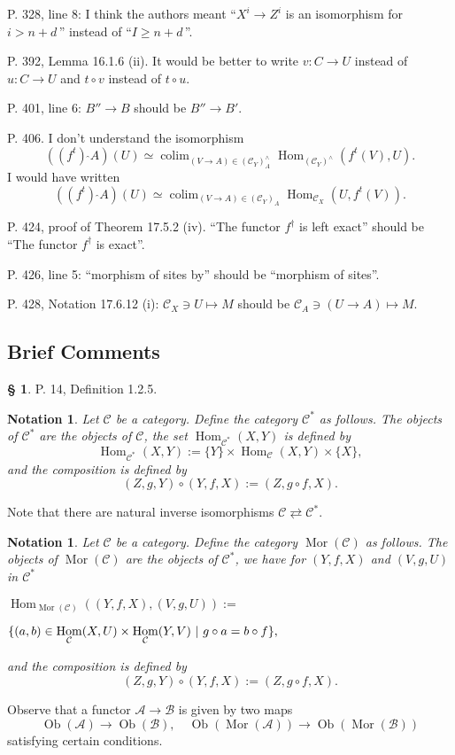 \documentclass[12pt]{article}
\newtheorem{nota}[thm]{Notation}
\theoremstyle{remark}
\theoremstyle{definition}
\newtheorem{cm}[thm]{\S}
\newcommand{\bc}{\begin{cm}}\newcommand{\ec}{\end{cm}}
\newcommand{\bu}{\bullet}
\newcommand{\n}{\noindent}
\newcommand{\A}{\mathcal A}
\newcommand{\B}{\mathcal B}
\newcommand{\C}{\mathcal C}
\newcommand{\be}{\begin{equation}}
\newcommand{\ee}{\end{equation}}
\DeclareMathOperator*{\co}{colim}
\DeclareMathOperator{\h}{Hom}
\DeclareMathOperator{\Mor}{Mor}
\DeclareMathOperator{\Ob}{Ob}
\begin{document}
\n P. 328, line 8: I think the authors meant ``$X^i\to Z^i$ is an isomorphism for $i>n+d\,$'' instead of ``$I\ge n+d\,$''. 

\n P. 392, Lemma 16.1.6 (ii). It would be better to write $v:C\to U$ instead of $u:C\to U$ and $t\circ v$ instead of $t\circ u$. 

\n P. 401, line 6: $B''\to B$ should be $B''\to B'$.

\n P. 406. I don't understand the isomorphism 
\be\label{406}
\left((f^t)\ \widehat{}A\right)(U)\simeq\co_{(V\to A)\in(\C_Y)_A^\wedge}\h_{(\C_Y)^\wedge}(f^t(V),U).
\ee 
I would have written 
$$
\left((f^t)\ \widehat{}A\right)(U)\simeq\co_{(V\to A)\in(\C_Y)_A}\h_{\C_X}(U,f^t(V)).
$$

\n P. 424, proof of Theorem 17.5.2 (iv). ``The functor $f^\dagger$ is left exact'' should be ``The functor $f^\dagger$ is exact''.

\n P. 426, line 5: ``morphism of sites by'' should be ``morphism of sites''.

\n P. 428, Notation 17.6.12 (i): $\C_X\ni U\mapsto M$ should be $\C_A\ni(U\to A)\mapsto M$.
%
\subsection{Brief Comments} %
%
\bc%
\label{d125} 
%
P. 14, Definition 1.2.5.
%
\begin{nota}\label{c*}
%
Let $\C$ be a category. Define the category $\C^*$ as follows. The objects of $\C^*$ are the objects of $\C$, the set $\h_{\C^*}(X,Y)$ is defined by  
$$
\h_{\C^*}(X,Y):=\{Y\}\times\h_{\C}(X,Y)\times\{X\},
$$
and the composition is defined by 
$$
(Z,g,Y)\circ(Y,f,X):=(Z,g\circ f,X).
$$ 
%
\end{nota}
%
Note that there are natural inverse isomorphisms $\C\rightleftarrows\C^*$. 
%
\begin{nota}\label{mor}
%
Let $\C$ be a category. Define the category $\Mor(\C)$ as follows. The objects of $\Mor(\C)$ are the objects of $\C^*$, we have for $(Y,f,X)$ and $(V,g,U)$ in $\C^*$\bigskip 

\n$\displaystyle \h_{\Mor(\C)}((Y,f,X),(V,g,U)):=$\bigskip 

$\hfill\displaystyle\{(a,b)\in\h_\C(X,U)\times\h_\C(Y,V)\ | \ g\circ a=b\circ f\},$\bigskip 

\n and the composition is defined by 
$$
(Z,g,Y)\circ(Y,f,X):=(Z,g\circ f,X).
$$
%
\end{nota}
%
Observe that a functor $\A\to\B$ is given by two maps 
$$
\Ob(\A)\to\Ob(\B),\quad\Ob(\Mor(\A))\to\Ob(\Mor(\B))
$$ 
satisfying certain conditions.
\ec 
\end{document}
